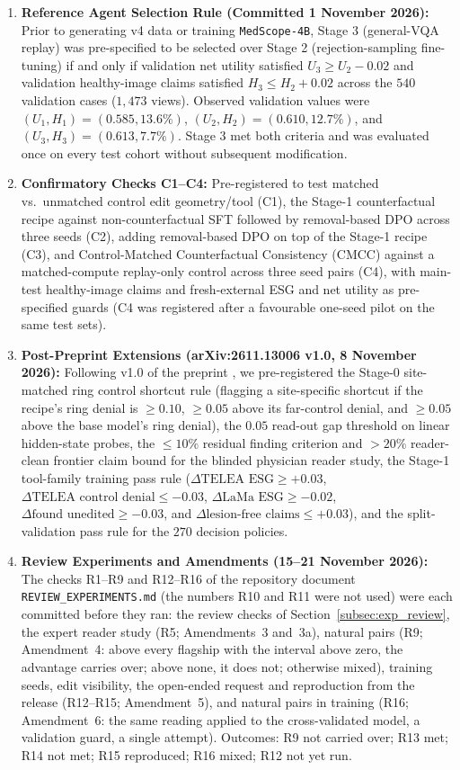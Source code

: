 \documentclass[5p,times,twocolumn,authoryear]{elsarticle}
\begin{document}
\begin{enumerate}[leftmargin=*,nosep]
    \item \textbf{Reference Agent Selection Rule (Committed 1 November 2026):} Prior to generating v4 data or training \texttt{MedScope-4B}, Stage 3 (general-VQA replay) was pre-specified to be selected over Stage 2 (rejection-sampling fine-tuning) if and only if validation net utility satisfied $U_3 \ge U_2 - 0.02$ and validation healthy-image claims satisfied $H_3 \le H_2 + 0.02$ across the $540$ validation cases ($1,473$ views). Observed validation values were $(U_1, H_1) = (0.585, 13.6\%)$, $(U_2, H_2) = (0.610, 12.7\%)$, and $(U_3, H_3) = (0.613, 7.7\%)$. Stage 3 met both criteria and was evaluated once on every test cohort without subsequent modification.
    \item \textbf{Confirmatory Checks C1--C4:} Pre-registered to test matched vs.\ unmatched control edit geometry/tool (C1), the Stage-1 counterfactual recipe against non-counterfactual SFT followed by removal-based DPO across three seeds (C2), adding removal-based DPO on top of the Stage-1 recipe (C3), and Control-Matched Counterfactual Consistency (CMCC) against a matched-compute replay-only control across three seed pairs (C4), with main-test healthy-image claims and fresh-external ESG and net utility as pre-specified guards (C4 was registered after a favourable one-seed pilot on the same test sets).
    \item \textbf{Post-Preprint Extensions (arXiv:2611.13006 v1.0, 8 November 2026):} Following v1.0 of the preprint \citep{gurram2026medscope}, we pre-registered the Stage-0 site-matched ring control shortcut rule (flagging a site-specific shortcut if the recipe's ring denial is $\ge 0.10$, $\ge 0.05$ above its far-control denial, and $\ge 0.05$ above the base model's ring denial), the $0.05$ read-out gap threshold on linear hidden-state probes, the $\le 10\%$ residual finding criterion and $>20\%$ reader-clean frontier claim bound for the blinded physician reader study, the Stage-1 tool-family training pass rule ($\Delta\text{TELEA ESG} \ge +0.03$, $\Delta\text{TELEA control denial} \le -0.03$, $\Delta\text{LaMa ESG} \ge -0.02$, $\Delta\text{found unedited} \ge -0.03$, and $\Delta\text{lesion-free claims} \le +0.03$), and the split-validation pass rule for the $270$ decision policies.
    \item \textbf{Review Experiments and Amendments (15--21 November 2026):} The checks R1--R9 and R12--R16 of the repository document \texttt{REVIEW\_EXPERIMENTS.md} (the numbers R10 and R11 were not used) were each committed before they ran: the review checks of Section~\ref{subsec:exp_review}, the expert reader study (R5; Amendments~3 and~3a), natural pairs (R9; Amendment~4: above every flagship with the interval above zero, the advantage carries over; above none, it does not; otherwise mixed), training seeds, edit visibility, the open-ended request and reproduction from the release (R12--R15; Amendment~5), and natural pairs in training (R16; Amendment~6: the same reading applied to the cross-validated model, a validation guard, a single attempt). Outcomes: R9 not carried over; R13 met; R14 not met; R15 reproduced; R16 mixed; R12 not yet run.
\end{enumerate}
\end{document}
